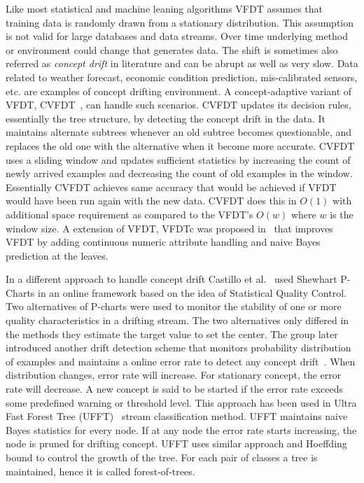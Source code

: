 Like most statistical and machine leaning algorithms VFDT assumes that training data is randomly drawn from a stationary distribution. This assumption is not valid for large databases and data streams. Over time underlying method or environment could change that generates data. The shift is sometimes also referred as {\it concept drift} in literature and can be abrupt as well as very slow. Data related to weather forecast, economic condition prediction, mis-calibrated sensors, etc. are examples of concept drifting environment. A concept-adaptive variant of VFDT, CVFDT~\cite{hulten01:cvfdt}, can handle such scenarios. CVFDT updates its decision rules, essentially the tree structure, by detecting the concept drift in the data. It maintains alternate subtrees whenever an old subtree becomes questionable, and replaces the old one with the alternative when it become more accurate. CVFDT uses a sliding window and updates sufficient statistics by increasing the count of newly arrived examples and decreasing the count of old examples in the window. Essentially CVFDT achieves same accuracy that would be achieved if VFDT would have been run again with the new data. CVFDT does this in $O(1)$ with additional space requirement as compared to the VFDT's $O(w)$ where $w$ is the window size. A extension of VFDT, VFDTc was proposed in~\cite{gama05:vfdtc} that improves VFDT by adding continuous numeric attribute handling and naive Bayes prediction at the leaves.

In a different approach to handle concept drift Castillo et al.~\cite{gama03:drift} used Shewhart P-Charts in an online framework based on the idea of Statistical Quality Control. Two alternatives of P-charts were used to monitor the stability of one or more quality characteristics in a drifting stream. The two alternatives only differed in the methods they estimate the target value to set the center. The group later introduced another drift detection scheme that monitors probability distribution of examples and maintains a online error rate to detect any concept drift~\cite{gama04:drift}. When distribution changes, error rate will increase. For stationary concept, the error rate will decrease. A new concept is said to be started if the error rate exceeds some predefined warning or threshold level. This approach has been used in Ultra Fast Forest Tree (UFFT)~\cite{gama04:ft, gama05:ft} stream classification method. UFFT maintains naive Bayes statistics for every node. If at any node the error rate starts increasing, the node is pruned for drifting concept. UFFT uses similar approach and Hoeffding bound to control the growth of the tree. For each pair of classes a tree is maintained, hence it is called forest-of-trees.

